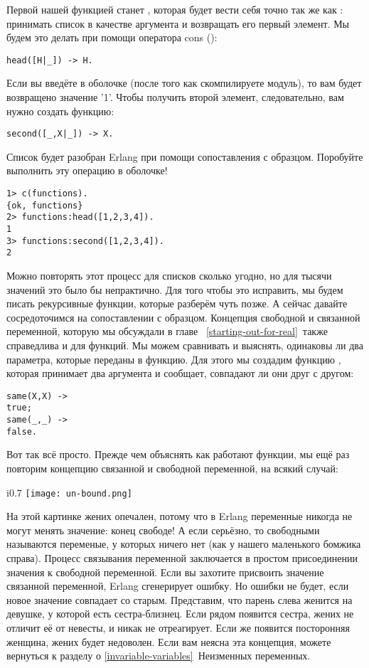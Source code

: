 Первой нашей функцией станет , которая будет вести себя точно так же как : принимать список в качестве аргумента и возвращать его первый элемент. Мы будем это делать при помощи оператора cons (\ops{\strut|}):
\begin{lstlisting}[style=erlang]
head([H|_]) -> H.
\end{lstlisting}

Если вы введёте в оболочке  (после того как скомпилируете модуль), то вам будет возвращено значение '1'. Чтобы получить второй элемент, следовательно, вам нужно создать функцию: 
\begin{lstlisting}[style=erlang]
second([_,X|_]) -> X.
\end{lstlisting}

Список будет разобран Erlang при помощи сопоставления с образцом. Поробуйте выполнить эту операцию в оболочке!
\begin{lstlisting}[style=erlang]
1> c(functions).
{ok, functions}
2> functions:head([1,2,3,4]).
1
3> functions:second([1,2,3,4]).
2
\end{lstlisting}

Можно повторять этот процесс для списков сколько угодно, но для тысячи значений это было бы непрактично. Для того чтобы это исправить, мы будем писать рекурсивные функции, которые разберём чуть позже. А сейчас давайте сосредоточимся на сопоставлении с образцом. Концепция свободной и связанной переменной, которую мы обсуждали в главе ~\ref{starting-out-for-real}~также справедлива и для функций. Мы можем сравнивать и выяснять, одинаковы ли два параметра, которые переданы в функцию. Для этого мы создадим функцию , которая принимает два аргумента и сообщает, совпадают ли они друг с другом:
\begin{lstlisting}[style=erlang]
same(X,X) ->
true;
same(_,_) ->
false.
\end{lstlisting}

Вот так всё просто. Прежде чем объяснять как работают функции, мы ещё раз повторим концепцию связанной и свободной переменной, на всякий случай:
\begin{wrapfigure}{i}{0.7\linewidth}
    \texttt{[image: un-bound.png]}
\end{wrapfigure}
На этой картинке жених опечален, потому что в Erlang переменные никогда не могут менять значение: конец свободе! А если серьёзно, то свободными называются переменые, у которых ничего нет (как у нашего маленького бомжика справа). Процесс связывания переменной заключается в простом присоединении значения к свободной переменной. Если вы захотите присвоить значение связанной переменной, Erlang сгенерирует ошибку. Но ошибки не будет, если новое значение совпадает со старым. Представим, что парень слева женится на девушке, у которой есть сестра\--близнец. Если рядом появится сестра, жених не отличит её от невесты, и никак не отреагирует. Если же появится посторонняя женщина, жених будет недоволен. Если вам неясна эта концепция, можете вернуться к разделу о \ref{invariable-variables}~Неизменных переменных.

